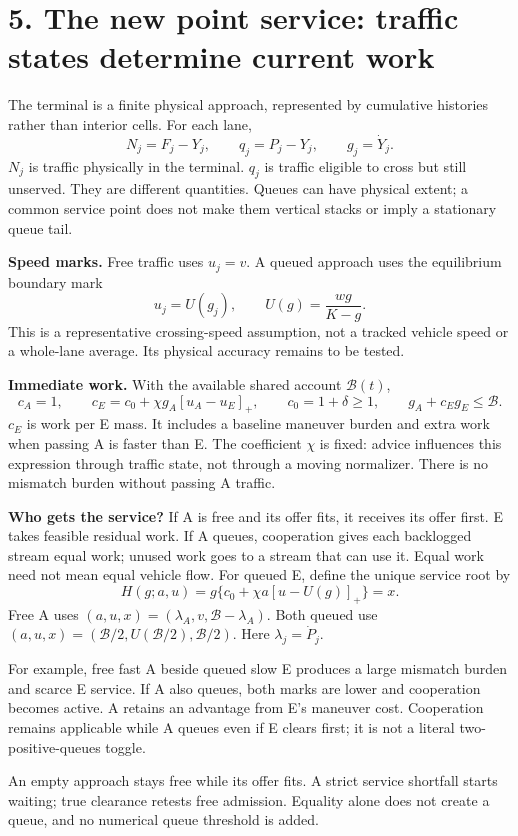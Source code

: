 \documentclass[11pt,a4paper]{article}
\newcommand{\pos}[1]{[#1]_+}
\newcommand{\budget}{\mathcal B}
\begin{document}
\newpage
\section*{5. The new point service: traffic states determine current work}
The terminal is a finite physical approach, represented by cumulative
histories rather than interior cells. For each lane,
\[
 N_j=F_j-Y_j,\qquad q_j=P_j-Y_j,\qquad g_j=\dot Y_j.
\]
$N_j$ is traffic physically in the terminal. $q_j$ is traffic eligible
to cross but still unserved. They are different quantities. Queues can
have physical extent; a common service point does not make them vertical
stacks or imply a stationary queue tail.

\textbf{Speed marks.} Free traffic uses $u_j=v$. A queued approach uses
the equilibrium boundary mark
\[
 u_j=U(g_j),\qquad U(g)=\frac{wg}{K-g}.
\]
This is a representative crossing-speed assumption, not a tracked vehicle
speed or a whole-lane average. Its physical accuracy remains to be tested.

\textbf{Immediate work.} With the available shared account $\budget(t)$,
\[
 c_A=1,\qquad c_E=c_0+\chi g_A\pos{u_A-u_E},\qquad
 c_0=1+\delta\geq1,\qquad g_A+c_Eg_E\leq\budget.
\]
$c_E$ is work per E mass. It includes a baseline maneuver burden and extra
work when passing A is faster than E. The coefficient $\chi$ is fixed:
advice influences this expression through traffic state, not through a
moving normalizer. There is no mismatch burden without passing A traffic.

\textbf{Who gets the service?} If A is free and its offer fits, it receives
its offer first. E takes feasible residual work. If A queues, cooperation
gives each backlogged stream equal work; unused work goes to a stream that
can use it. Equal work need not mean equal vehicle flow. For queued E,
define the unique service root by
\[
 H(g;a,u)=g\{c_0+\chi a\pos{u-U(g)}\}=x.
\]
Free A uses $(a,u,x)=(\lambda_A,v,\budget-\lambda_A)$.
Both queued use $(a,u,x)=(\budget/2,U(\budget/2),\budget/2)$.
Here $\lambda_j=\dot P_j$.

For example, free fast A beside queued slow E produces a large mismatch
burden and scarce E service. If A also queues, both marks are lower and
cooperation becomes active. A retains an advantage from E's maneuver
cost. Cooperation remains applicable while A queues even if E clears
first; it is not a literal two-positive-queues toggle.

An empty approach stays free while its offer fits. A strict service
shortfall starts waiting; true clearance retests free admission. Equality
alone does not create a queue, and no numerical queue threshold is added.
\end{document}
